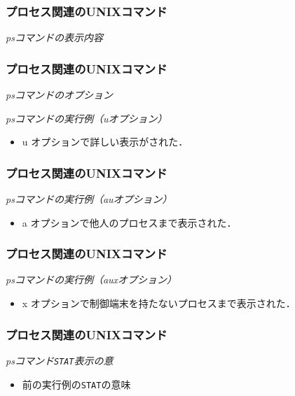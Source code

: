 \documentclass{beamer}                 %
\begin{document}
\begin{frame}[fragile]
  \frametitle{プロセス関連のUNIXコマンド}
  \emph{psコマンドの表示内容}
\end{frame}

\begin{frame}[fragile]
  \frametitle{プロセス関連のUNIXコマンド}
  \emph{psコマンドのオプション}

  \emph{psコマンドの実行例（uオプション）}

  \begin{itemize}
  \item u オプションで詳しい表示がされた．
  \end{itemize}
\end{frame}

\begin{frame}[fragile]
  \frametitle{プロセス関連のUNIXコマンド}
  \emph{psコマンドの実行例（auオプション）}

  \begin{itemize}
  \item a オプションで他人のプロセスまで表示された．
  \end{itemize}
\end{frame}

\begin{frame}[fragile]
  \frametitle{プロセス関連のUNIXコマンド}
  \emph{psコマンドの実行例（auxオプション）}

  \begin{itemize}
  \item x オプションで制御端末を持たないプロセスまで表示された．
  \end{itemize}
\end{frame}

\begin{frame}[fragile]
  \frametitle{プロセス関連のUNIXコマンド}
  \emph{psコマンド\texttt{STAT}表示の意}

  \begin{itemize}
  \item 前の実行例の\texttt{STAT}の意味
  \end{itemize}
\end{frame}
\end{document}
